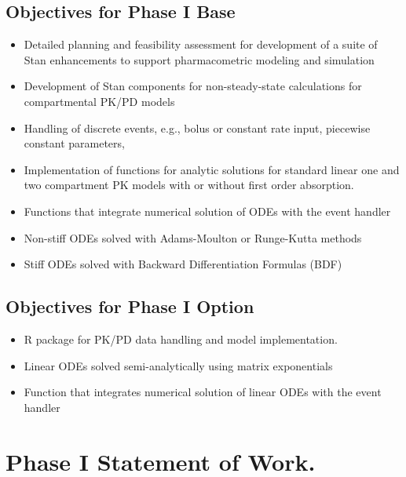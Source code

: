 \documentclass[11pt]{nih2016}
\begin{document}
\subsection{Objectives for Phase I Base}

\begin{itemize}
\item Detailed planning and feasibility assessment for development of
  a suite of Stan enhancements to support pharmacometric modeling and
  simulation
\item Development of Stan components for non-steady-state calculations
  for compartmental PK/PD models
\item Handling of discrete events, e.g., bolus or constant rate input,
  piecewise constant parameters,
\item Implementation of functions for analytic solutions for standard
  linear one and two compartment PK models with or without first order
  absorption.
\item Functions that integrate numerical solution of ODEs with the
  event handler
\item Non-stiff ODEs solved with Adams-Moulton or Runge-Kutta methods
\item Stiff ODEs solved with Backward Differentiation Formulas (BDF)
\end{itemize}

\subsection{Objectives for Phase I Option}

\begin{itemize}
\item R package for PK/PD data handling and model implementation.
\item Linear ODEs solved semi-analytically using matrix exponentials
\item Function that integrates numerical solution of linear ODEs
  with the event handler
\end{itemize}

\section{Phase I Statement of Work.}


\end{document}
